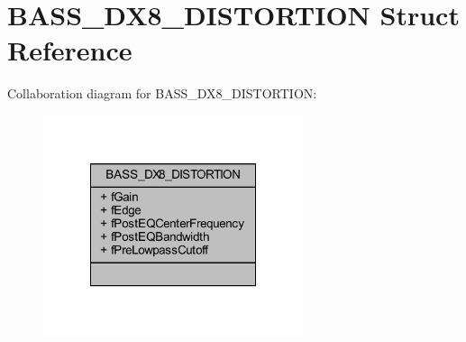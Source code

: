 \hypertarget{struct_b_a_s_s___d_x8___d_i_s_t_o_r_t_i_o_n}{\section{B\-A\-S\-S\-\_\-\-D\-X8\-\_\-\-D\-I\-S\-T\-O\-R\-T\-I\-O\-N Struct Reference}
\label{struct_b_a_s_s___d_x8___d_i_s_t_o_r_t_i_o_n}
}


Collaboration diagram for B\-A\-S\-S\-\_\-\-D\-X8\-\_\-\-D\-I\-S\-T\-O\-R\-T\-I\-O\-N\-:\nopagebreak
\begin{figure}[H]
\begin{center}
\leavevmode
\includegraphics[width=216pt]{struct_b_a_s_s___d_x8___d_i_s_t_o_r_t_i_o_n__coll__graph}
\end{center}
\end{figure}
